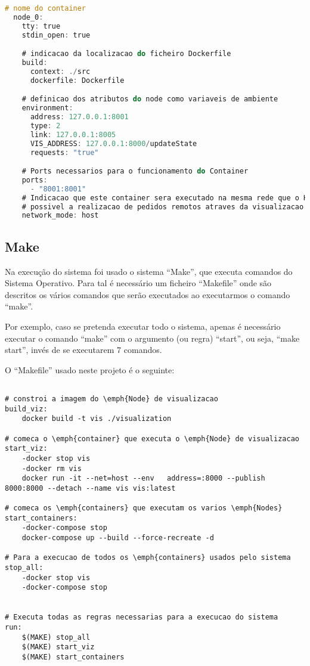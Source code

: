\begin{lstlisting}[caption={Ficheiro docker-compose.yml},language=C]
  # nome do container
  node_0:
    tty: true
    stdin_open: true

    # indicacao da localizacao do ficheiro Dockerfile
    build:
      context: ./src
      dockerfile: Dockerfile

    # definicao dos atributos do node como variaveis de ambiente
    environment:
      address: 127.0.0.1:8001
      type: 2 
      link: 127.0.0.1:8005
      VIS_ADDRESS: 127.0.0.1:8000/updateState
      requests: "true"

    # Ports necessarios para o funcionamento do Container
    ports:
      - "8001:8001"
    # Indicacao que este container sera executado na mesma rede que o Host, isto para que seja
    # possivel a realizacao de pedidos remotos atraves da visualizacao
    network_mode: host
\end{lstlisting}


\subsection*{Make}

Na execução do sistema foi usado o sistema ``Make'', que executa comandos do Sistema Operativo. Para tal é necessário um ficheiro ``Makefile'' onde são descritos os vários comandos que serão executados ao executarmos o comando ``make''.

Por exemplo, caso se pretenda executar todo o sistema, apenas é necessário executar o comando ``make'' com o argumento (ou regra) ``start'', ou seja, ``make start'', invés de se executarem 7 comandos.


O ``Makefile'' usado neste projeto é o seguinte:

\begin{lstlisting}[caption={Ficheiro ``Makefile''}]

# constroi a imagem do \emph{Node} de visualizacao
build_viz:
	docker build -t vis ./visualization

# comeca o \emph{container} que executa o \emph{Node} de visualizacao
start_viz:
	-docker stop vis
	-docker rm vis
	docker run -it --net=host --env   address=:8000 --publish 8000:8000 --detach --name vis vis:latest

# comeca os \emph{containers} que executam os varios \emph{Nodes}
start_containers:
	-docker-compose stop
	docker-compose up --build --force-recreate -d

# Para a execucao de todos os \emph{containers} usados pelo sistema
stop_all:
	-docker stop vis
	-docker-compose stop


# Executa todas as regras necessarias para a execucao do sistema
run:
	$(MAKE) stop_all
	$(MAKE) start_viz
	$(MAKE) start_containers
\end{lstlisting}




